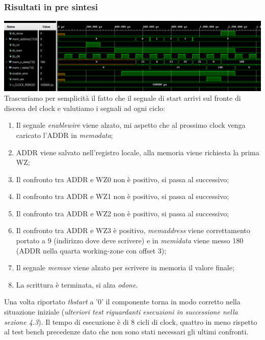 \documentclass{article}
\begin{document}
\subsubsection{Risultati in pre sintesi}
\includegraphics[width=\textwidth]{tb1.png}
Trascuriamo per semplicità il fatto che il segnale di start arrivi sul fronte di discesa del clock e valutiamo i segnali ad ogni ciclo:
\begin{enumerate}
	\item Il segnale \textit{enable\textunderscore wire} viene alzato, mi aspetto che al prossimo clock venga caricato l'ADDR in \textit{mem\textunderscore o\textunderscore data};
	\item ADDR viene salvato nell'registro locale, alla memoria viene richiesta la prima WZ;
	\item Il confronto tra ADDR e WZ0 non è positivo, si passa al successivo;
	\item Il confronto tra ADDR e WZ1 non è positivo, si passa al successivo;
	\item Il confronto tra ADDR e WZ2 non è positivo, si passa al successivo;
	\item Il confronto tra ADDR e WZ3 è positivo, \textit{mem\textunderscore address} viene correttamento portato a 9 (indirizzo dove deve scrivere) e in \textit{mem\textunderscore i\textunderscore data} viene messo 180 (ADDR nella quarta working-zone con offset 3);
	\item Il segnale \textit{mem\textunderscore we} viene alzato per scrivere in memoria il valore finale;
	\item La scrittura è terminata, si alza \textit{o\textunderscore done}.
\end{enumerate}
Una volta riportato \textit{tb\textunderscore start} a '0' il componente torna in modo corretto nella situazione iniziale (\textit{ulteriori test riguardanti esecuzioni in successione nella sezione 4.3}).
Il tempo di esecuzione è di 8 cicli di clock, quattro in meno rispetto al test bench precedenze dato che non sono stati necessari gli ultimi confronti.
\newpage
\end{document}

